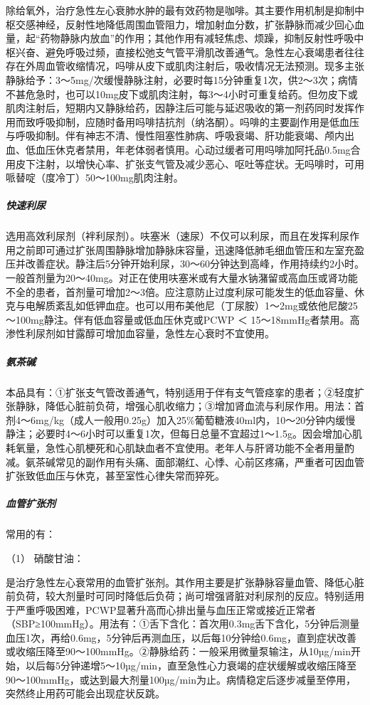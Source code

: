 除给氧外，治疗急性左心衰肺水肿的最有效药物是咖啡。其主要作用机制是抑制中枢交感神经，反射性地降低周围血管阻力，增加射血分数，扩张静脉而减少回心血量，起“药物静脉内放血”的作用；其他作用有减轻焦虑、烦躁，抑制反射性呼吸中枢兴奋、避免呼吸过频，直接松弛支气管平滑肌改善通气。急性左心衰竭患者往往存在外周血管收缩情况，吗啡从皮下或肌肉注射后，吸收情况无法预测。现多主张静脉给予：3～5mg/次缓慢静脉注射，必要时每15分钟重复1次，供2～3次；病情不甚危急时，也可以10mg皮下或肌肉注射，每3～4小时可重复给药。但勿皮下或肌肉注射后，短期内又静脉给药，因静注后可能与延迟吸收的第一剂药同时发挥作用而致呼吸抑制，应随时备用吗啡拮抗剂（纳洛酮）。吗啡的主要副作用是低血压与呼吸抑制。伴有神志不清、慢性阻塞性肺病、呼吸衰竭、肝功能衰竭、颅内出血、低血压休克者禁用，年老体弱者慎用。心动过缓者可用吗啡加阿托品0.5mg合用皮下注射，以增快心率、扩张支气管及减少恶心、呕吐等症状。无吗啡时，可用哌替啶（度冷丁）50～100mg肌肉注射。

\subparagraph{快速利尿}

选用高效利尿剂（袢利尿剂）。呋塞米（速尿）不仅可以利尿，而且在发挥利尿作用之前即可通过扩张周围静脉增加静脉床容量，迅速降低肺毛细血管压和左室充盈压并改善症状。静注后5分钟开始利尿，30～60分钟达到高峰，作用持续约2小时。一般首剂量为20～40mg。对正在使用呋塞米或有大量水钠潴留或高血压或肾功能不全的患者，首剂量可增加2～3倍。应注意防止过度利尿可能发生的低血容量、休克与电解质紊乱如低钾血症。也可以用布美他尼（丁尿胺）1～2mg或依他尼酸25～100mg静注。伴有低血容量或低血压休克或PCWP
＜
15～18mmHg者禁用。高渗性利尿剂如甘露醇可增加血容量，急性左心衰时不宜使用。

\subparagraph{氨茶碱}

本品具有：①扩张支气管改善通气，特别适用于伴有支气管痉挛的患者；②轻度扩张静脉，降低心脏前负荷，增强心肌收缩力；③增加肾血流与利尿作用。用法：首剂4～6mg/kg（成人一般用0.25g）加入25\%葡萄糖液40ml内，10～20分钟内缓慢静注；必要时4～6小时可以重复1次，但每日总量不宜超过1～1.5g。因会增加心肌耗氧量，急性心肌梗死和心肌缺血者不宜使用。老年人与肝肾功能不全者用量酌减。氨茶碱常见的副作用有头痛、面部潮红、心悸、心前区疼痛，严重者可因血管扩张致低血压与休克，甚至室性心律失常而猝死。

\subparagraph{血管扩张剂}

常用的有：

\hypertarget{text00070.htmlux5cux23CHP3-2-4-3-4-1}{}
（1） 硝酸甘油：

是治疗急性左心衰常用的血管扩张剂。其作用主要是扩张静脉容量血管、降低心脏前负荷，较大剂量时可同时降低后负荷；尚可增强肾脏对利尿剂的反应。特别适用于严重呼吸困难，PCWP显著升高而心排出量与血压正常或接近正常者（SBP≥100mmHg）。用法有：①舌下含化：首次用0.3mg舌下含化，5分钟后测量血压1次，再给0.6mg，5分钟后再测血压，以后每10分钟给0.6mg，直到症状改善或收缩压降至90～100mmHg。②静脉给药：一般采用微量泵输注，从10µg/min开始，以后每5分钟递增5～10µg/min，直至急性心力衰竭的症状缓解或收缩压降至90～100mmHg，或达到最大剂量100µg/min为止。病情稳定后逐步减量至停用，突然终止用药可能会出现症状反跳。

